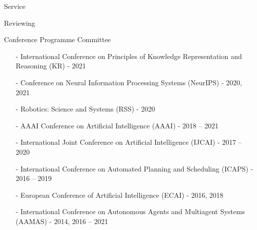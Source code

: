 \begin{rSection}{Service}
\begin{rSubsection}{Reviewing}{}{}{}
\item{Conference Programme Committee}
\begin{itemize}
\vspace*{-0.2cm}
\item[-]  International Conference on Principles of Knowledge Representation and Reasoning (KR) - 2021\vspace*{-0.2cm}
\item[-] Conference on Neural Information Processing Systems (NeurIPS) - 2020, 2021 \vspace*{-0.2cm}
\item[-] Robotics: Science and Systems (RSS) - 2020 \vspace*{-0.2cm}
\item[-]  AAAI Conference on Artificial Intelligence (AAAI) - 2018 -- 2021\vspace*{-0.2cm}
\item[-]  International Joint Conference on Artificial Intelligence (IJCAI) - 2017 -- 2020\vspace*{-0.2cm}
\item[-]  International Conference on Automated Planning and Scheduling (ICAPS) - 2016 -- 2019\vspace*{-0.2cm}
\item[-]  European Conference of Artificial Intelligence (ECAI) - 2016, 2018\vspace*{-0.2cm}
\item[-]  International Conference on Autonomous Agents and Multiagent Systems (AAMAS) - 2014, 2016 -- 2021
\end{itemize}


\end{rSubsection}
\end{rSection}

